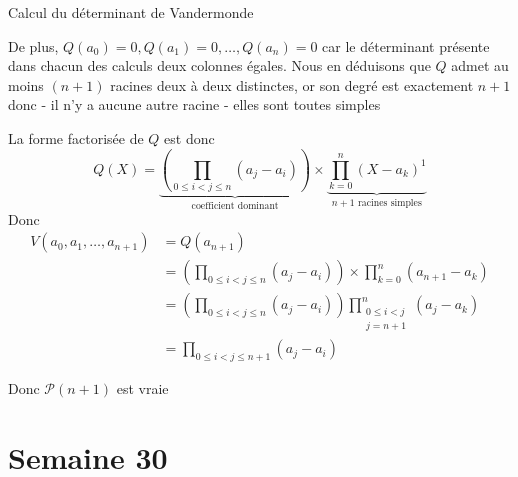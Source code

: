 \documentclass{article}
\renewenvironment{question_kholle}[2][ ]
{
	\subsection{\texorpdfstring{#2}{}}
	\notblank{#1}
	{
		\noindent #1
		\bigbreak
	}
	{}
	\begin{proof}
}
{
	\end{proof}
}
\begin{document}
\begin{question_kholle}{Calcul du déterminant de Vandermonde}
\begin{itemize}[label=$\lozenge$]
\begin{itemize}
De plus, $Q(a_{0})=0, Q(a_{1})=0, \dots, Q(a_{n})=0$ car le déterminant présente dans chacun des calculs deux colonnes égales. Nous en déduisons que $Q$ admet au moins $(n+1)$ racines deux à deux distinctes, or son degré est exactement $n+1$ donc
- il n'y a aucune autre racine
- elles sont toutes simples

La forme factorisée de $Q$ est donc
$$
Q(X)=\underbrace{ \left( \prod_{0\leqslant i < j \leqslant n} (a_{j}-a_{i})\right) }_{ \text{coefficient dominant} } \times \underbrace{ \prod_{k=0}^{n}(X-a_{k})^{1} }_{ n+1 \text{ racines simples} }
$$
Donc 
\begin{align*}
V(a_{0}, a_{1},\dots, a_{n+1})&=Q(a_{n+1}) \\
&=  \left( \prod_{0\leqslant i < j \leqslant n} (a_{j}-a_{i})\right) \times  \prod_{k=0}^{n}(a_{n+1}-a_{k})  \\
&= \left( \prod_{0\leqslant i < j \leqslant n} (a_{j}-a_{i})\right) \prod_{\substack{0\leqslant i<j \\ j=n+1}}^{n}(a_{j}-a_{k}) \\
&= \prod_{0\leqslant i < j \leqslant n+1} (a_{j}-a_{i})
\end{align*}

Donc $\mathcal{P}(n+1)$ est vraie
\end{itemize}
\end{itemize}
\end{question_kholle}
\pagebreak\section{Semaine 30}
\end{document}
